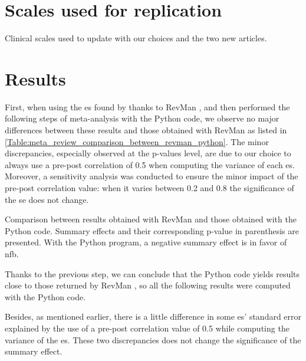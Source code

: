 \documentclass[12pt,a4paper,english]{article}
\begin{document}
\clearpage

\section{Scales used for replication}

\begin{table}[h!]
  \centering
  \caption{Clinical scales used to update \citet{Cortese2016} with our choices and the two new articles.}

  \label{Table:Table_mr_clinical_scales_update_cortese}
\end{table}


\section{Results}

First, when using the \gls{es} found by \citet{Cortese2016} thanks to RevMan \citep{RevMan}, and then performed the following steps 
of meta-analysis with the Python code, we observe no major differences between these results and those obtained with RevMan \citep{RevMan} 
as listed in \cref{Table:meta_review_comparison_between_revman_python}. The minor discrepancies, especially observed at the p-values level,
are due to our choice to always use a pre-post correlation of 0.5 when computing the variance of each \gls{es}. Moreover, a sensitivity 
analysis was conducted to ensure the minor impact of the pre-post correlation value: when it varies between 0.2 and 0.8 the significance 
of the \gls{se} does not change. 

\begin{table}[h!]
  \centering
  \caption{Comparison between \citet{Cortese2016} results obtained with RevMan \citep{RevMan} and those obtained with the Python code. Summary 
	effects and their corresponding p-value in parenthesis are presented. With the Python program, a negative summary effect is in favor of \gls{nfb}.}

  \label{Table:meta_review_comparison_between_revman_python}
\end{table}

Thanks to the previous step, we can conclude that the Python code yields results close to those returned by RevMan \citet{RevMan}, so all 
the following results were computed with the Python code.

Besides, as mentioned earlier, 
		there is a little difference in some \gls{es}' standard error explained by the use of a pre-post correlation value  of 0.5 
		while computing the variance of the \gls{es}. These two discrepancies does not change the significance of the summary effect.
		
\end{document}
